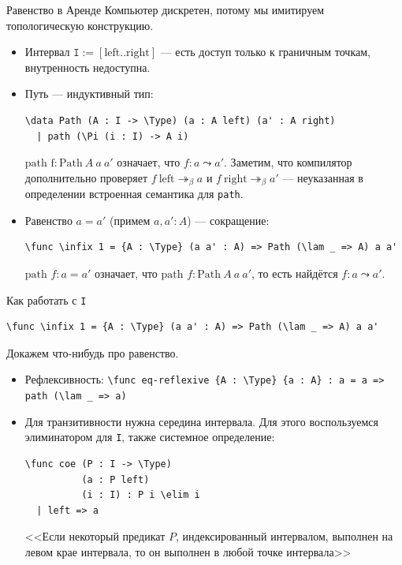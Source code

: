 \documentclass[aspectratio=169]{beamer}
\begin{document}
\begin{frame}[fragile]{Равенство в Аренде}
Компьютер дискретен, потому мы имитируем топологическую конструкцию.
\begin{itemize}
\item Интервал $\texttt{I} := [\text{left}..\text{right}]$ --- есть доступ только к граничным точкам, внутренность недоступна.
\item Путь --- индуктивный тип:
\small\color[HTML]{025002}\begin{verbatim}
\data Path (A : I -> \Type) (a : A left) (a' : A right)
  | path (\Pi (i : I) -> A i)
\end{verbatim}\normalsize
\color{black}

$\text{path f}:\text{Path}\ A\ a\ a'$  означает, что $f: a \leadsto a'$.
Заметим, что компилятор дополнительно проверяет $f\ \text{left}\twoheadrightarrow_\beta a$ и $f\ \text{right}\twoheadrightarrow_\beta a'$ --- 
неуказанная в определении встроенная семантика для \verb!path!.
\item Равенство $a = a'$ (примем $a,a':A$) --- сокращение:
\small\color[HTML]{025002}\begin{verbatim}
\func \infix 1 = {A : \Type} (a a' : A) => Path (\lam _ => A) a a'
\end{verbatim}\normalsize
\color{black}

$\text{path }f : a = a'$ означает, что $\text{path }f:\text{Path}\ A\ a\ a'$, то есть найдётся $f : a \leadsto a'$.
\end{itemize}
\end{frame}

\begin{frame}[fragile]{Как работать с \texttt{I}}

\small\color[HTML]{025002}\begin{verbatim}
\func \infix 1 = {A : \Type} (a a' : A) => Path (\lam _ => A) a a'
\end{verbatim}\normalsize
\color{black}

Докажем что-нибудь про равенство.
\begin{itemize}
\item Рефлексивность: 
\small\color[HTML]{025002}\verb!\func eq-reflexive {A : \Type} {a : A} : a = a => path (\lam _ => a)!\normalsize\color{black}

\item Для транзитивности нужна середина интервала. Для этого воспользуемся 
элиминатором для \verb!I!, также системное определение:
\small\color[HTML]{025002}\begin{verbatim}
\func coe (P : I -> \Type)
          (a : P left)
          (i : I) : P i \elim i
  | left => a
\end{verbatim}\normalsize
\color{black}

<<Если некоторый предикат $P$, индексированный интервалом, выполнен на левом крае интервала, то он выполнен в любой точке интервала>>

\end{itemize}
\end{frame}
\end{document}
